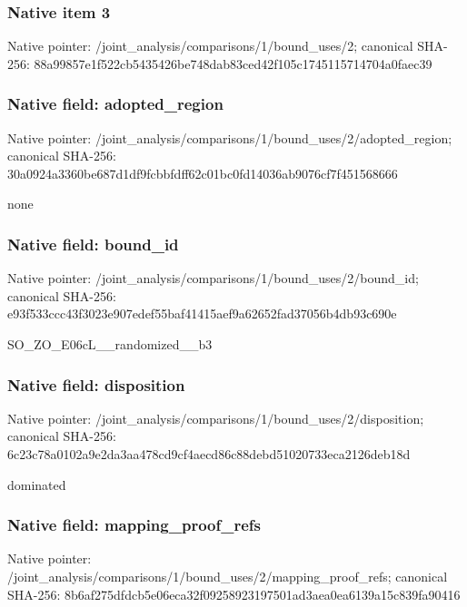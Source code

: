 \documentclass[10pt,a4paper]{article}
\begin{document}
\subsubsection{Native item 3}


Native pointer: /joint\_analysis/comparis\allowbreak{}ons/1/bound\_uses/2; canonical SHA-256: 88a99857e1f522cb5435426b\allowbreak{}e748dab83ced42f105c17451\allowbreak{}15714704a0faec39



\subsubsection{Native field: adopted\_region}


Native pointer: /joint\_analysis/comparis\allowbreak{}ons/1/bound\_uses/2/adopt\allowbreak{}ed\_region; canonical SHA-256: 30a0924a3360be687d1df9fc\allowbreak{}bbfdff62c01bc0fd14036ab9\allowbreak{}076cf7f451568666


none


\subsubsection{Native field: bound\_id}


Native pointer: /joint\_analysis/comparis\allowbreak{}ons/1/bound\_uses/2/bound\allowbreak{}\_id; canonical SHA-256: e93f533ccc43f3023e907ede\allowbreak{}f55baf41415aef9a62652fad\allowbreak{}37056b4db93c690e


SO\_ZO\_E06cL\_\_randomized\_\_b3


\subsubsection{Native field: disposition}


Native pointer: /joint\_analysis/comparis\allowbreak{}ons/1/bound\_uses/2/dispo\allowbreak{}sition; canonical SHA-256: 6c23c78a0102a9e2da3aa478\allowbreak{}cd9cf4aecd86c88debd51020\allowbreak{}733eca2126deb18d


dominated


\subsubsection{Native field: mapping\_proof\_refs}


Native pointer: /joint\_analysis/comparis\allowbreak{}ons/1/bound\_uses/2/mappi\allowbreak{}ng\_proof\_refs; canonical SHA-256: 8b6af275dfdcb5e06eca32f0\allowbreak{}9258923197501ad3aea0ea61\allowbreak{}39a15c839fa90416
\end{document}
